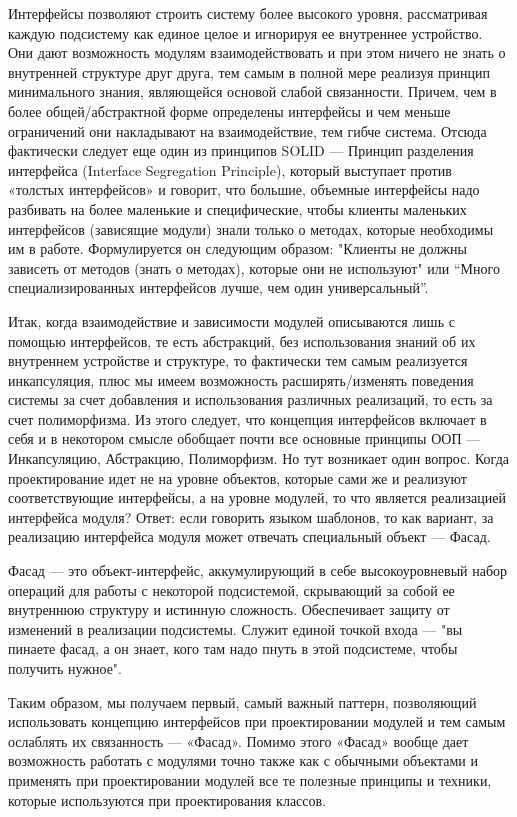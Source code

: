 \documentclass[a4paper]{article}
\begin{document}
Интерфейсы позволяют строить систему более высокого уровня, рассматривая каждую подсистему как единое целое и игнорируя ее внутреннее устройство. Они дают возможность модулям взаимодействовать и при этом ничего не знать о внутренней структуре друг друга, тем самым в полной мере реализуя принцип минимального знания, являющейся основой слабой связанности. Причем, чем в более общей/абстрактной форме определены интерфейсы и чем меньше ограничений они накладывают на взаимодействие, тем гибче система. Отсюда фактически следует еще один из принципов SOLID — Принцип разделения интерфейса (Interface Segregation Principle), который выступает против «толстых интерфейсов» и говорит, что большие, объемные интерфейсы надо разбивать на более маленькие и специфические, чтобы клиенты маленьких интерфейсов (зависящие модули) знали только о методах, которые необходимы им в работе. Формулируется он следующим образом: "Клиенты не должны зависеть от методов (знать о методах), которые они не используют" или “Много специализированных интерфейсов лучше, чем один универсальный”.

Итак, когда взаимодействие и зависимости модулей описываются лишь с помощью интерфейсов, те есть абстракций, без использования знаний об их внутреннем устройстве и структуре, то фактически тем самым реализуется инкапсуляция, плюс мы имеем возможность расширять/изменять поведения системы за счет добавления и использования различных реализаций, то есть за счет полиморфизма. Из этого следует, что концепция интерфейсов включает в себя и в некотором смысле обобщает почти все основные принципы ООП — Инкапсуляцию, Абстракцию, Полиморфизм. Но тут возникает один вопрос. Когда проектирование идет не на уровне объектов, которые сами же и реализуют соответствующие интерфейсы, а на уровне модулей, то что является реализацией интерфейса модуля? Ответ: если говорить языком шаблонов, то как вариант, за реализацию интерфейса модуля может отвечать специальный объект — Фасад.

Фасад — это объект-интерфейс, аккумулирующий в себе высокоуровневый набор операций для работы с некоторой подсистемой, скрывающий за собой ее внутреннюю структуру и истинную сложность. Обеспечивает защиту от изменений в реализации подсистемы. Служит единой точкой входа — "вы пинаете фасад, а он знает, кого там надо пнуть в этой подсистеме, чтобы получить нужное".


Таким образом, мы получаем первый, самый важный паттерн, позволяющий использовать концепцию интерфейсов при проектировании модулей и тем самым ослаблять их связанность — «Фасад». Помимо этого «Фасад» вообще дает возможность работать с модулями точно также как с обычными объектами и применять при проектировании модулей все те полезные принципы и техники, которые используются при проектирования классов.
\end{document}
